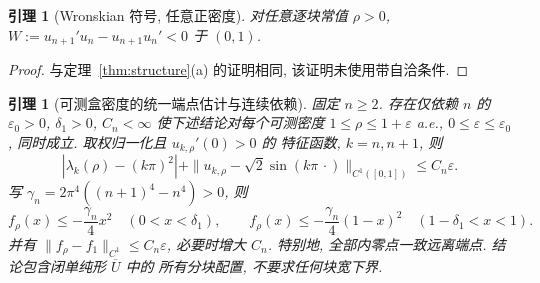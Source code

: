 \documentclass[UTF8]{ctexart}
\newtheorem{lemma}[theorem]{引理}
\begin{document}
\begin{lemma}[Wronskian 符号, 任意正密度]\label{lem:W}
对任意逐块常值 $\rho>0$, $W:=u_{n+1}'u_n-u_{n+1}u_n'<0$ 于 $(0,1)$.
\end{lemma}
\begin{proof}
与定理~\ref{thm:structure}(a) 的证明相同, 该证明未使用带自洽条件.
\end{proof}

\begin{lemma}[可测盒密度的统一端点估计与连续依赖]\label{lem:away}
固定 $n\ge2$. 存在仅依赖 $n$ 的 $\varepsilon_0>0$, $\delta_1>0$, $C_n<\infty$
使下述结论对每个可测密度 $1\le\rho\le1+\varepsilon$ a.e.,
$0\le\varepsilon\le\varepsilon_0$, 同时成立. 取权归一化且 $u_{k,\rho}'(0)>0$ 的
特征函数, $k=n,n+1$, 则
\begin{equation}\label{eq:uniform-c1}
|\lambda_k(\rho)-(k\pi)^2|+
\|u_{k,\rho}-\sqrt2\sin(k\pi\,\cdot)\|_{C^1([0,1])}\le C_n\varepsilon.
\end{equation}
写 $\gamma_n=2\pi^4((n+1)^4-n^4)>0$, 则
\begin{equation}\label{eq:uniform-endpoint}
f_\rho(x)\le-\frac{\gamma_n}{4}x^2\quad(0<x<\delta_1),\qquad
f_\rho(x)\le-\frac{\gamma_n}{4}(1-x)^2\quad(1-\delta_1<x<1).
\end{equation}
并有 $\|f_\rho-f_1\|_{C^1}\le C_n\varepsilon$, 必要时增大 $C_n$.
特别地, 全部内零点一致远离端点. 结论包含闭单纯形 $\overline U$ 中的
所有分块配置, 不要求任何块宽下界.
\end{lemma}
\end{document}

